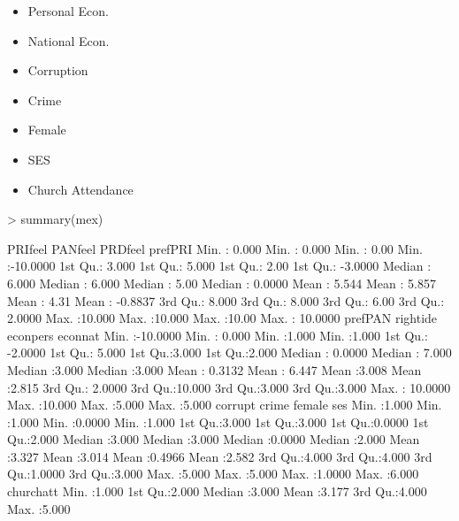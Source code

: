 \documentclass[12pt]{article}
\begin{document}
\begin{enumerate}
\begin{itemize}
  \item Personal Econ.  
  
  \item National Econ.
  
  \item Corruption
  
  \item Crime
  
  \item Female
  
  \item SES
  
  \item Church Attendance
  
\end{itemize}

\begin{Schunk}
\begin{Sinput}
> summary(mex)
\end{Sinput}
\begin{Soutput}
    PRIfeel          PANfeel          PRDfeel         prefPRI        
 Min.   : 0.000   Min.   : 0.000   Min.   : 0.00   Min.   :-10.0000  
 1st Qu.: 3.000   1st Qu.: 5.000   1st Qu.: 2.00   1st Qu.: -3.0000  
 Median : 6.000   Median : 6.000   Median : 5.00   Median :  0.0000  
 Mean   : 5.544   Mean   : 5.857   Mean   : 4.31   Mean   : -0.8837  
 3rd Qu.: 8.000   3rd Qu.: 8.000   3rd Qu.: 6.00   3rd Qu.:  2.0000  
 Max.   :10.000   Max.   :10.000   Max.   :10.00   Max.   : 10.0000  
    prefPAN            rightide         econpers        econnat     
 Min.   :-10.0000   Min.   : 0.000   Min.   :1.000   Min.   :1.000  
 1st Qu.: -2.0000   1st Qu.: 5.000   1st Qu.:3.000   1st Qu.:2.000  
 Median :  0.0000   Median : 7.000   Median :3.000   Median :3.000  
 Mean   :  0.3132   Mean   : 6.447   Mean   :3.008   Mean   :2.815  
 3rd Qu.:  2.0000   3rd Qu.:10.000   3rd Qu.:3.000   3rd Qu.:3.000  
 Max.   : 10.0000   Max.   :10.000   Max.   :5.000   Max.   :5.000  
    corrupt          crime           female            ses       
 Min.   :1.000   Min.   :1.000   Min.   :0.0000   Min.   :1.000  
 1st Qu.:3.000   1st Qu.:3.000   1st Qu.:0.0000   1st Qu.:2.000  
 Median :3.000   Median :3.000   Median :0.0000   Median :2.000  
 Mean   :3.327   Mean   :3.014   Mean   :0.4966   Mean   :2.582  
 3rd Qu.:4.000   3rd Qu.:4.000   3rd Qu.:1.0000   3rd Qu.:3.000  
 Max.   :5.000   Max.   :5.000   Max.   :1.0000   Max.   :6.000  
   churchatt    
 Min.   :1.000  
 1st Qu.:2.000  
 Median :3.000  
 Mean   :3.177  
 3rd Qu.:4.000  
 Max.   :5.000  
\end{Soutput}

\end{Schunk}
\end{enumerate}
\end{document}
